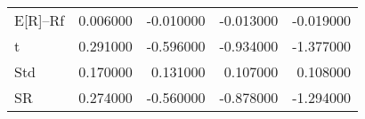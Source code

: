 \begin{tabular}{lrrrr}
\toprule
\midrule
E[R]--Rf & 0.006000 & -0.010000 & -0.013000 & -0.019000 \\
t & 0.291000 & -0.596000 & -0.934000 & -1.377000 \\
Std & 0.170000 & 0.131000 & 0.107000 & 0.108000 \\
SR & 0.274000 & -0.560000 & -0.878000 & -1.294000 \\
\bottomrule
\end{tabular}
